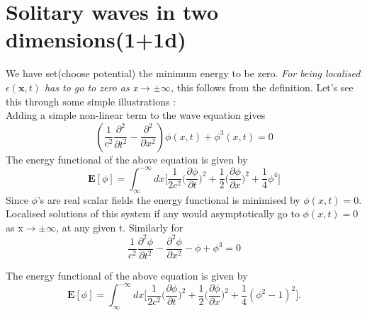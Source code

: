 \documentclass[a4paper, 12pt]{article}
\begin{document}
\section {Solitary waves in two dimensions(1+1d)} 
We have set(choose potential) the minimum energy to be zero. \textit{For being localised $\epsilon(\bm x,t)$ has to go to zero as x$\to \pm \infty$,} this follows from the definition. Let's see this through some simple illustrations : 
\\
 Adding a simple non-linear term to the wave equation gives
\begin{equation}%
\left(\frac{1}{c^2}\frac{\partial^2}{\partial t^2} - \frac{\partial^2}{\partial x^2} \right)\phi(x,t) + \phi^3(x,t)=0
\end{equation}
 The energy functional of the above equation is given by
 \begin{equation}%
\bm  E[\phi] = \int_{\infty}^{-\infty} dx \bigg[ \frac{1}{2c^2}\bigg(\frac{\partial\phi}{\partial t}\bigg)^2 +\frac{1}{2}\bigg(\frac{\partial\phi}{\partial x}\bigg)^2 +\frac{1}{4}\phi^4 \bigg]
 \end{equation}
  Since $\phi$'s are real scalar fields the energy functional is minimised by $\phi(x,t) = 0$. Localised solutions of this system if any would asymptotically go to $\phi(x,t) = 0$ as x$\to \pm \infty$, at any given t. Similarly for
 \begin{equation}%
\frac{1}{c^2}\frac{\partial^2\phi}{\partial t^2} - \frac{\partial^2\phi}{\partial x^2} -\phi + \phi^3=0
\end{equation}
 
 The energy functional of the above equation is given by
 \begin{equation}%
\bm  E[\phi] = \int_{\infty}^{-\infty} dx \bigg[ \frac{1}{2c^2}\bigg(\frac{\partial\phi}{\partial t}\bigg)^2 +\frac{1}{2}\bigg(\frac{\partial\phi}{\partial x}\bigg)^2 +\frac{1}{4}(\phi^2 - 1)^2 \bigg].
 \end{equation}
 
\end{document}
